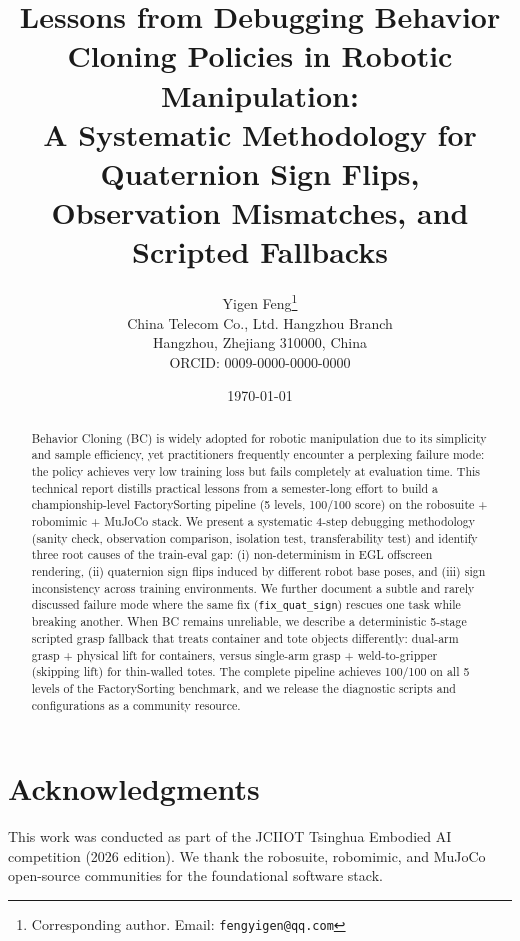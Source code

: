 \documentclass[11pt,a4paper]{article}
\title{Lessons from Debugging Behavior Cloning Policies in Robotic Manipulation: \\
       A Systematic Methodology for Quaternion Sign Flips, \\
       Observation Mismatches, and Scripted Fallbacks}
\author{
  Yigen Feng\thanks{Corresponding author. Email: \texttt{fengyigen@qq.com}} \\
  China Telecom Co., Ltd. Hangzhou Branch \\
  Hangzhou, Zhejiang 310000, China \\
  ORCID: 0009-0000-0000-0000
}
\date{\today}
\newcommand{\code}[1]{\texttt{#1}}
\begin{document}
\maketitle

\begin{abstract}
Behavior Cloning (BC) is widely adopted for robotic manipulation due to its simplicity and sample efficiency, yet practitioners frequently encounter a perplexing failure mode: the policy achieves very low training loss but fails completely at evaluation time. This technical report distills practical lessons from a semester-long effort to build a championship-level FactorySorting pipeline (5 levels, 100/100 score) on the robosuite + robomimic + MuJoCo stack. We present a systematic 4-step debugging methodology (sanity check, observation comparison, isolation test, transferability test) and identify three root causes of the train-eval gap: (i) non-determinism in EGL offscreen rendering, (ii) quaternion sign flips induced by different robot base poses, and (iii) sign inconsistency across training environments. We further document a subtle and rarely discussed failure mode where the same fix (\code{fix\_quat\_sign}) rescues one task while breaking another. When BC remains unreliable, we describe a deterministic 5-stage scripted grasp fallback that treats container and tote objects differently: dual-arm grasp + physical lift for containers, versus single-arm grasp + weld-to-gripper (skipping lift) for thin-walled totes. The complete pipeline achieves 100/100 on all 5 levels of the FactorySorting benchmark, and we release the diagnostic scripts and configurations as a community resource.
\end{abstract}










\section*{Acknowledgments}
This work was conducted as part of the JCIIOT Tsinghua Embodied AI competition (2026 edition). We thank the robosuite, robomimic, and MuJoCo open-source communities for the foundational software stack.



\end{document}
